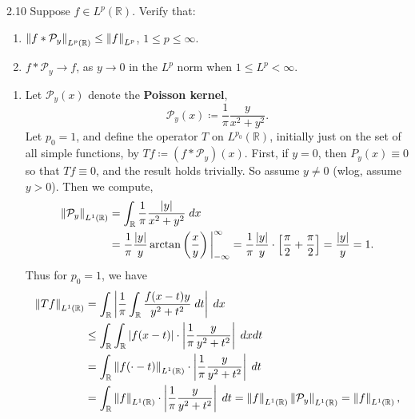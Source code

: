 \documentclass{article}
\begin{document}
\begin{prb}{2.10}
	Suppose $f \in L^{p}(\mathbb{R})$. Verify that: \vspace{-0.25cm}
	\begin{enumerate}[itemsep =-2pt,label = (\alph{*})]
		\item $\left\Vert f \ast \mathcal{P}_{y} \right\Vert_{L^{p}(\mathbb{R})} \leq \left\Vert f \right\Vert_{L^{p}}$, $1 \leq p \leq \infty$. 
		\item $f \ast \mathcal{P}_{y} \to f$, as $y \to 0$ in the $L^{p}$ norm when $1 \leq L^{p} < \infty$. 
	\end{enumerate}
\end{prb} 
\begin{enumerate}[itemsep =-2pt,label = (\alph{*})]
	\item Let $\mathcal{P}_{y}(x)$ denote the \textbf{Poisson kernel}, 
		\begin{equation*}
			\mathcal{P}_{y}(x) \coloneqq \frac{1}{\pi}\frac{y}{x^{2} + y^{2}}. 
		\end{equation*} 
		Let $p_{0} = 1$, and define the operator $T$ on $L^{p_{0}}(\mathbb{R})$, initially just on the set of all simple functions, by $Tf \coloneqq (f \ast \mathcal{P}_{y})(x)$. First, if $y = 0$, then $P_{y}(x) \equiv 0$ so that $Tf \equiv 0$, and the result holds trivially. So assume $y \neq 0$ (wlog, assume $y > 0$). Then we compute, 
		\begin{align*}
			\begin{split}
				\left\Vert \mathcal{P}_{y} \right\Vert_{L^{1}(\mathbb{R})} &= \int_{\mathbb{R}} \frac{1}{\pi}\frac{\left| y \right|}{x^{2} + y^{2}}\;dx \\
				&= \frac{1}{\pi}\frac{|y|}{y} \arctan\left(\frac{x}{y}\right)\bigg|_{-\infty}^{\infty} = \frac{1}{\pi}\frac{|y|}{y} \cdot \left[\frac{\pi}{2} + \frac{\pi}{2}\right] = \frac{|y|}{y} =1. 
			\end{split} 
		\end{align*}
		Thus for $p_{0} = 1$, we have 
		\begin{align*}
			\begin{split} 
				\norm{Tf}_{L^{1}(\mathbb{R})} &= \int_{\mathbb{R}}\abs{\frac{1}{\pi}\int_{\mathbb{R}}\frac{f(x - t)y}{y^{2} + t^{2}}\;dt}\;dx \\
				&\leq \int_{\mathbb{R}}\int_{\mathbb{R}}|f(x - t)| \cdot \abs{\frac{1}{\pi}\frac{y}{y^{2} + t^{2}}}\;dx dt \\
				&= \int_{\mathbb{R}}\norm{f(\cdot - t)}_{L^{1}(\mathbb{R})} \cdot \abs{\frac{1}{\pi}\frac{y}{y^{2} + t^{2}}}\;dt  \\
				&= \int_{\mathbb{R}}\norm{f}_{L^{1}(\mathbb{R})} \cdot \abs{\frac{1}{\pi}\frac{y}{y^{2} + t^{2}}}\;dt = \norm{f}_{L^{1}(\mathbb{R})}\norm{\mathcal{P}_{y}}_{L^{1}(\mathbb{R})} = \norm{f}_{L^{1}(\mathbb{R})}, 

\end{split}
\end{align*}
\end{enumerate}
\end{document}
